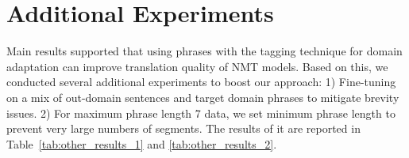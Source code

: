\section{Additional Experiments}\label{section:additional_experiments}%
Main results supported that using phrases with the tagging technique for domain adaptation can improve translation quality of NMT models. Based on this, we conducted several additional experiments to boost our approach: 1) Fine-tuning on a mix of out-domain sentences and target domain phrases to mitigate brevity issues.  2) For maximum phrase length 7 data, we set minimum phrase length to prevent very large numbers of segments. The results of it are reported in Table~\ref{tab:other_results_1} and \ref{tab:other_results_2}. 

